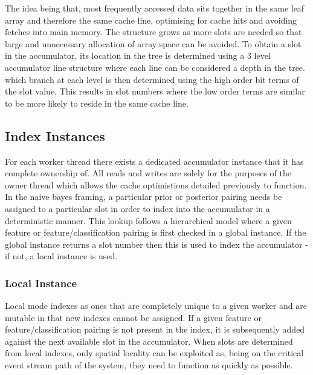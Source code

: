 \documentclass[a4paper,11pt]{scrreprt}
\begin{document}
The idea being that, most frequently accessed data sits together in the same leaf array and therefore the same cache line, optimising for cache hits and avoiding fetches into main memory. The structure grows as more slots are needed so that large and unnecessary allocation of array space can be avoided. To obtain a slot in the accumulator, its location in the tree is determined using a 3 level accumulator line structure where each line can be considered a depth in the tree. which branch at each level is then determined using the high order bit terms of the slot value. This results in slot numbers where the low order terms are similar to be more likely to reside in the same cache line.

\subsection{Index Instances}
For each worker thread there exists a dedicated accumulator instance that it has complete ownership of. All reads and writes are solely for the purposes of the owner thread which allows the cache optimistions detailed previously to function. In the naive bayes framing, a particular prior or posterior pairing needs be assigned to a particular slot in order to index into the accumulator in a deterministic manner. This lookup follows a hierarchical model where a given feature or feature/classification pairing is first checked in a global instance. If the global instance returns a slot number then this is used to index the accumulator - if not, a local instance is used.
\subsubsection{Local Instance}
Local mode indexes as ones that are completely unique to a given worker and are mutable in that new indexes cannot be assigned. If a given feature or feature/classification pairing is not present in the index, it is subsequently added against the next available slot in the accumulator. When slots are determined from local indexes, only spatial locality can be exploited as, being on the critical event stream path of the system, they need to function as quickly as possible.
\end{document}
